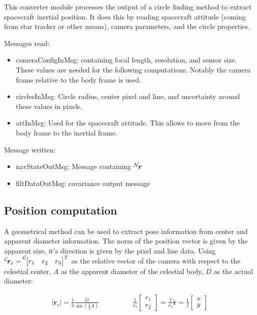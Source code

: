 This converter module processes the output of a circle finding method to extract spacecraft inertial position. It does this by reading spacecraft attitude (coming from star tracker or other means), camera parameters, and the circle properties. 

Messages read:

\begin{itemize}
\item cameraConfigInMsg: containing focal length, resolution, and sensor size. These values are needed for the following computations. Notably the camera frame relative to the body frame is used.
\item circlesInMsg: Circle radius, center pixel and line, and uncertainty around these values in pixels. 
\item attInMsg: Used for the spacecraft attitude. This allows to move from the body frame to the inertial frame.
\end{itemize}

Message written:
\begin{itemize}
\item navStateOutMsg: Message containing $\leftexp{N}{\bm r}$ 
\item filtDataOutMsg: covariance output message
\end{itemize}

\subsection{Position computation}

A geometrical method can be used to extract pose information from center and apparent diameter information. The norm of the position vector is given by the apparent size, it's direction is given by the pixel and line data. Using $\leftexp{C}{\bm r_c} = \leftexp{C}{\begin{bmatrix} r_1 & r_2 & r_3 \end{bmatrix}}^T$ as the relative vector of the camera with respect to the celestial center, $A$ as the apparent diameter of the celestial body, $D$ as the actual diameter:

\begin{align}\label{eq:cad}
|\bm r_c| = \frac{1}{2}\frac{D}{\sin\left(\frac{1}{2} A\right)} \hspace{2cm} \frac{1}{r_3}\begin{bmatrix} r_1 \\ r_2 \end{bmatrix}= \frac{1}{r_3}\tilde{\bm r} = \frac{1}{f}\begin{bmatrix} x \\ y \end{bmatrix}
\end{align}

